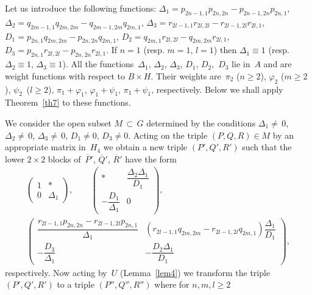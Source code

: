 \documentclass[12pt]{amsart}
\theoremstyle{definition}
\theoremstyle{remark}
\begin{document}
Let us introduce the following functions:
$\Delta_1=p_{2n-1,1}p_{2n,2n}-p_{2n-1,2n}p_{2n,1}$,
$\Delta_2=q_{2m-1,1}q_{2m,2m}-q_{2m-1,2m}q_{2m,1}$,
$\Delta_3=r_{2l-1,1}r_{2l,2l}-r_{2l-1,2l}r_{2l,1}$,
$D_1=p_{2n,1}q_{2m,2m}-p_{2n,2n}q_{2m,1}$,
$D_2=q_{2m,1}r_{2l,2l}-q_{2m,2m}r_{2l,1}$,
$D_3=p_{2n,1}r_{2l,2l}-p_{2n,2n}r_{2l,1}$. If $n=1$ (resp. $m=1$,
$l=1$) then $\Delta_1\equiv1$ (resp. $\Delta_2\equiv1$,
$\Delta_3\equiv1$). All the functions~$\Delta_1$, $\Delta_2$,
$\Delta_3$, $D_1$, $D_2$,~$D_3$ lie in~$A$ and are weight functions
with respect to $B\times H$. Their weights are~$\pi_2$ ($n{\geqslant}2$),
$\varphi_2$ ($m{\geqslant}2$), $\psi_2$~($l{\geqslant}2$), $\pi_1+\varphi_1$,
$\varphi_1+\psi_1$, $\pi_1+\psi_1$, respectively. Below we shall
apply Theorem~\ref{th7} to these functions.

We consider the open subset $M\,{\subset}\, G$ determined by the
conditions $\Delta_1{\ne}\,0$, $\Delta_2{\ne}\,0$,
$\Delta_3{\ne}\,0$, $D_1\ne0$, $D_3\ne0$. Acting on the triple
$(P,Q,R)\in M$ by an appropriate matrix in~$H_4$ we obtain a new
triple $(P',Q',R')$ such that the lower $2\times 2$ blocks
of~$\overline P{}'$, $\overline Q{}'$, $\overline R{}'$ have the
form
\begin{gather*}
\begin{pmatrix}
1 & *
\\
0 & \Delta_1
\end{pmatrix},\qquad
\begin{pmatrix}
* & \dfrac{\Delta_2\Delta_1}{D_1}
\\
-\dfrac{D_1}{\Delta_1} & 0
\end{pmatrix},
\\
\begin{pmatrix}
\dfrac{r_{2l-1,1}p_{2n,2n}-r_{2l-1,2l}p_{2n,1}}{\Delta_1} &
(r_{2l-1,1}q_{2m,2m}-r_{2l-1,2l}q_{2m,1})\dfrac{\Delta_1}{D_1}
\\[3mm]
-\dfrac{D_3}{\Delta_1} & -\dfrac{D_2\Delta_1}{D_1}
\end{pmatrix},
\end{gather*}
respectively. Now acting by~$U$ (Lemma~\ref{lem4}) we transform the
triple $(P',Q',R')$ to a triple $(P'',Q'',R'')$ where for
$n,m,l{\geqslant}2$
\end{document}
